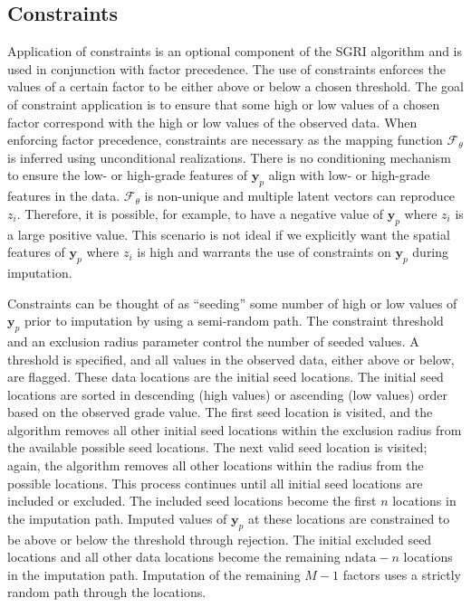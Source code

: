 \subsection{Constraints}
\label{subsec:05constraints}

Application of constraints is an optional component of the \gls{SGRI} algorithm and is used in conjunction with factor precedence. The use of constraints enforces the values of a certain factor to be either above or below a chosen threshold. The goal of constraint application is to ensure that some high or low values of a chosen factor correspond with the high or low values of the observed data. When enforcing factor precedence, constraints are necessary as the mapping function $\mathcal{F}_{\theta}$ is inferred using unconditional realizations. There is no conditioning mechanism to ensure the low- or high-grade features of $\mathbf{y}_{p}$ align with low- or high-grade features in the data. $\mathcal{F}_{\theta}$ is non-unique and multiple latent vectors can reproduce $z_{i}$. Therefore, it is possible, for example, to have a negative value of $\mathbf{y}_{p}$ where $z_{i}$ is a large positive value. This scenario is not ideal if we explicitly want the spatial features of $\mathbf{y}_{p}$ where $z_{i}$ is high and warrants the use of constraints on $\mathbf{y}_{p}$ during imputation.

Constraints can be thought of as ``seeding'' some number of high or low values of $\mathbf{y}_{p}$ prior to imputation by using a semi-random path. The constraint threshold and an exclusion radius parameter control the number of seeded values. A threshold is specified, and all values in the observed data, either above or below, are flagged. These data locations are the initial seed locations. The initial seed locations are sorted in descending (high values) or ascending (low values) order based on the observed grade value. The first seed location is visited, and the algorithm removes all other initial seed locations within the exclusion radius from the available possible seed locations. The next valid seed location is visited; again, the algorithm removes all other locations within the radius from the possible locations. This process continues until all initial seed locations are included or excluded. The included seed locations become the first $n$ locations in the imputation path. Imputed values of $\mathbf{y}_{p}$ at these locations are constrained to be above or below the threshold through rejection. The initial excluded seed locations and all other data locations become the remaining $\text{ndata} - n$ locations in the imputation path. Imputation of the remaining $M-1$ factors uses a strictly random path through the locations.


